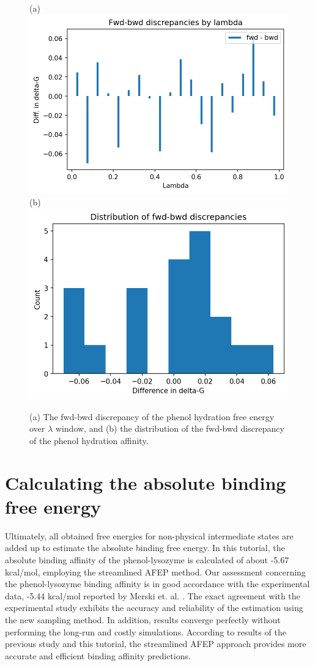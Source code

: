 \documentclass[9pt,tutorial]{livecoms}
\begin{document}
\begin{figure}[h!t]
\centering
(a)
\includegraphics[width=0.8\linewidth]{Supp-Files/AFEP-Hydration/output/Alchemlyb/output_7_1.png}
\\
\centering
(b)
\includegraphics[width=0.8\linewidth]{Supp-Files/AFEP-Hydration/output/Alchemlyb/output_8_1.png}
\caption{(a) The fwd-bwd discrepancy of the phenol hydration free energy over $\lambda$ window, and (b) the distribution of the fwd-bwd discrepancy of the phenol hydration affinity. }
\label{fig:AFEP-Hyd-2}
\end{figure}


\section{Calculating the absolute binding free energy}\label{sec:12}

Ultimately, all obtained free energies for non-physical intermediate states are added up to estimate the absolute binding free energy. In this tutorial, the absolute binding affinity of the phenol-lysozyme is calculated of about -5.67 kcal/mol, employing the streamlined AFEP method. Our assessment concerning the phenol-lysozyme binding affinity is in good accordance with the experimental data, -5.44 kcal/mol reported by Merski et. al. \cite{Merski2013}. The exact agreement with the experimental study exhibits the accuracy and reliability of the estimation using the new sampling method. In addition, results converge perfectly without performing the long-run and costly simulations. According to results of the previous study \cite{Salari2018} and this tutorial, the streamlined AFEP approach provides more accurate and efficient binding affinity predictions.
\end{document}
